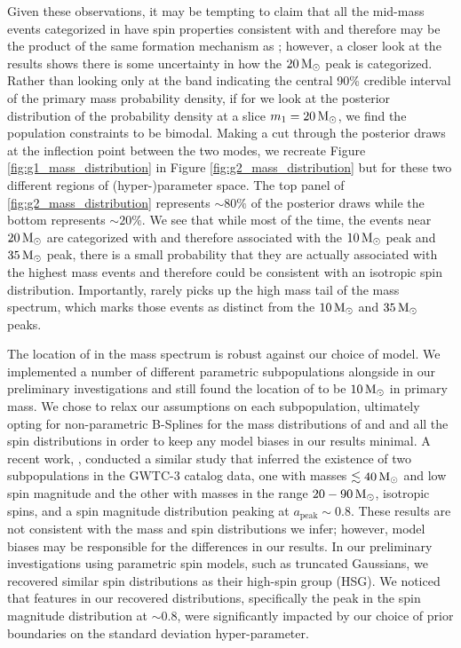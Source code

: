 Given these observations, it may be tempting to claim that all the mid-mass events categorized in \contA{} have spin properties consistent with \first{} and therefore may be the product of the same formation mechanism as \first{}; however, a closer look at the results shows there is some uncertainty in how the $20 {\,\rm M}_\odot$ peak is categorized. Rather than looking only at the band indicating the central 90\% credible interval of the primary mass probability density, if for \contB{} we look at the posterior distribution of the probability density at a slice $m_1 = 20 {\,\rm M}_\odot$, we find the population constraints to be bimodal. Making a cut through the posterior draws at the inflection point between the two modes, we recreate Figure \ref{fig:g1_mass_distribution} in Figure \ref{fig:g2_mass_distribution} but for these two different regions of (hyper-)parameter space. The top panel of \ref{fig:g2_mass_distribution} represents $\sim80\%$ of the posterior draws while the bottom represents $\sim20\%$. We see that while most of the time, the events near $20{\,\rm M}_\odot$ are categorized with \contA{} and therefore associated with the $10{\,\rm M}_\odot$ peak and $35{\,\rm M}_\odot$ peak, there is a small probability that they are actually associated with the highest mass events and therefore could be consistent with an isotropic spin distribution. Importantly, \contA{} rarely picks up the high mass tail of the mass spectrum, which marks those events as distinct from the $10{\,\rm M}_\odot$ and $35{\,\rm M}_\odot$ peaks.

The location of \first{} in the mass spectrum is robust against our choice of model. We implemented a number of different parametric subpopulations alongside \first{} in our preliminary investigations and still found the location of \first{} to be $10{\,\rm M}_\odot$ in primary mass. We chose to relax our assumptions on each subpopulation, ultimately opting for non-parametric B-Splines for the mass distributions of \contA{} and \contB{} and all the spin distributions in order to keep any model biases in our results minimal. A recent work, \citet{2303.02973}, conducted a similar study that inferred the existence of two subpopulations in the GWTC-3 catalog data, one with masses $\lesssim 40{\,\rm M}_\odot$ and low spin magnitude and the other with masses in the range $20-90{\,\rm M}_\odot$, isotropic spins, and a spin magnitude distribution peaking at $a_\text{peak} \sim 0.8$. These results are not consistent with the mass and spin distributions we infer; however, model biases may be responsible for the differences in our results. In our preliminary investigations using parametric spin models, such as truncated Gaussians, we recovered similar spin distributions as their high-spin group (HSG). We noticed that features in our recovered distributions, specifically the peak in the spin magnitude distribution at $\sim 0.8$, were significantly impacted by our choice of prior boundaries on the standard deviation hyper-parameter.

